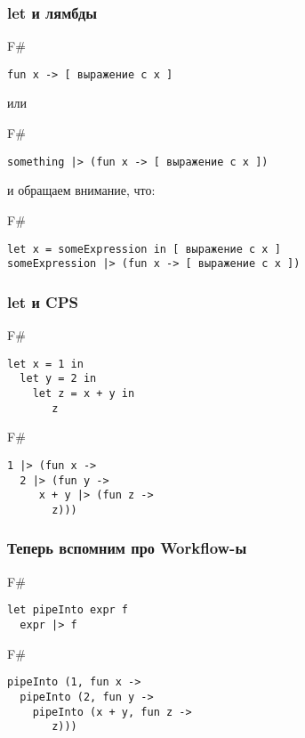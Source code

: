 \documentclass[xetex,mathserif,serif]{beamer}
\begin{document}
	\begin{frame}[fragile]
		\frametitle{let и лямбды}
   		\begin{exampleblock}{F\#}
   			\begin{lstlisting}
fun x -> [ выражение c x ]
\end{lstlisting}
\end{exampleblock}
или
   		\begin{exampleblock}{F\#}
   			\begin{lstlisting}
something |> (fun x -> [ выражение c x ])
\end{lstlisting}
\end{exampleblock}
и обращаем внимание, что:
   		\begin{exampleblock}{F\#}
   			\begin{lstlisting}
let x = someExpression in [ выражение c x ]
someExpression |> (fun x -> [ выражение c x ])
\end{lstlisting}
\end{exampleblock}
\end{frame}

	\begin{frame}[fragile]
		\frametitle{let и CPS}
   		\begin{exampleblock}{F\#}
   			\begin{lstlisting}
let x = 1 in   
  let y = 2 in 
    let z = x + y in
       z    
\end{lstlisting}
\end{exampleblock}
   		\begin{exampleblock}{F\#}
   			\begin{lstlisting}
1 |> (fun x ->
  2 |> (fun y -> 
     x + y |> (fun z -> 
       z)))
\end{lstlisting}
\end{exampleblock}
\end{frame}

	\begin{frame}[fragile]
		\frametitle{Теперь вспомним про Workflow-ы}
   		\begin{exampleblock}{F\#}
   			\begin{lstlisting}
let pipeInto expr f
  expr |> f
\end{lstlisting}
\end{exampleblock}
   		\begin{exampleblock}{F\#}
   			\begin{lstlisting}
pipeInto (1, fun x ->
  pipeInto (2, fun y -> 
    pipeInto (x + y, fun z -> 
       z)))
\end{lstlisting}
\end{exampleblock}
\end{frame}
\end{document}
